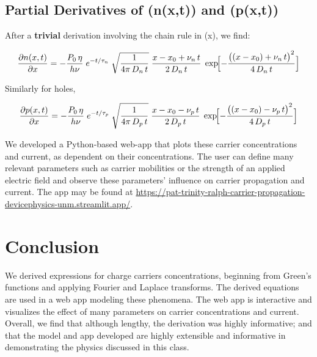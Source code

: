 \documentclass[
  journal,
]{IEEEtran}%
\begin{document}
\subsection{Partial Derivatives of (n(x,t)) and
(p(x,t))}\label{partial-derivatives-of-nxt-and-pxt}

After a \textbf{trivial} derivation involving the chain rule in (x), we
find:

\[
\frac{\partial n(x,t)}{\partial x}
= -\frac{P_{0}\,\eta}{h\nu}
  \;e^{-t/\tau_{n}}
  \;\sqrt{\frac{1}{4\pi\,D_{n}\,t}}
  \;\frac{x - x_{0} + \nu_{n}\,t}{2\,D_{n}\,t}
  \;\exp\!\Bigl[-\frac{\bigl((x - x_{0}) + \nu_{n}\,t\bigr)^{2}}{4\,D_{n}\,t}\Bigr]
\]

Similarly for holes,

\[
\frac{\partial p(x,t)}{\partial x}
= -\frac{P_{0}\,\eta}{h\nu}
  \;e^{-t/\tau_{p}}
  \;\sqrt{\frac{1}{4\pi\,D_{p}\,t}}
  \;\frac{x - x_{0} - \nu_{p}\,t}{2\,D_{p}\,t}
  \;\exp\!\Bigl[-\frac{\bigl((x - x_{0}) - \nu_{p}\,t\bigr)^{2}}{4\,D_{p}\,t}\Bigr]
\]

We developed a Python-based web-app that plots these carrier
concentrations and current, as dependent on their concentrations. The
user can define many relevant parameters such as carrier mobilities or
the strength of an applied electric field and observe these parameters'
influence on carrier propagation and current. The app may be found at
\url{https://pat-trinity-ralph-carrier-propagation-devicephysics-unm.streamlit.app/}.

\section{Conclusion}\label{conclusion}

We derived expressions for charge carriers concentrations, beginning
from Green's functions and applying Fourier and Laplace transforms. The
derived equations are used in a web app modeling these phenomena. The
web app is interactive and visualizes the effect of many parameters on
carrier concentrations and current. Overall, we find that although
lengthy, the derivation was highly informative; and that the model and
app developed are highly extensible and informative in demonstrating the
physics discussed in this class.


\ifCLASSOPTIONcaptionsoff
  \newpage
\fi



\pagebreak[3]
\end{document}
